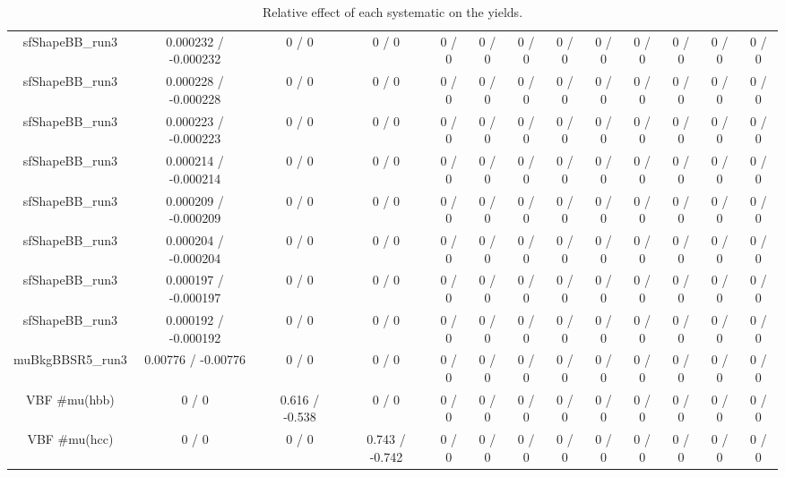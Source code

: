 \documentclass[10pt]{article}
\begin{document}
\begin{table}[htbp]
\begin{center}
\begin{tabular}{|c|c|c|c|c|c|c|c|c|c|c|c|c|}
  sfShapeBB_run3 & 0.000232 / -0.000232 & 0 / 0 & 0 / 0 & 0 / 0 & 0 / 0 & 0 / 0 & 0 / 0 & 0 / 0 & 0 / 0 & 0 / 0 & 0 / 0 & 0 / 0 \\ 
  sfShapeBB_run3 & 0.000228 / -0.000228 & 0 / 0 & 0 / 0 & 0 / 0 & 0 / 0 & 0 / 0 & 0 / 0 & 0 / 0 & 0 / 0 & 0 / 0 & 0 / 0 & 0 / 0 \\ 
  sfShapeBB_run3 & 0.000223 / -0.000223 & 0 / 0 & 0 / 0 & 0 / 0 & 0 / 0 & 0 / 0 & 0 / 0 & 0 / 0 & 0 / 0 & 0 / 0 & 0 / 0 & 0 / 0 \\ 
  sfShapeBB_run3 & 0.000214 / -0.000214 & 0 / 0 & 0 / 0 & 0 / 0 & 0 / 0 & 0 / 0 & 0 / 0 & 0 / 0 & 0 / 0 & 0 / 0 & 0 / 0 & 0 / 0 \\ 
  sfShapeBB_run3 & 0.000209 / -0.000209 & 0 / 0 & 0 / 0 & 0 / 0 & 0 / 0 & 0 / 0 & 0 / 0 & 0 / 0 & 0 / 0 & 0 / 0 & 0 / 0 & 0 / 0 \\ 
  sfShapeBB_run3 & 0.000204 / -0.000204 & 0 / 0 & 0 / 0 & 0 / 0 & 0 / 0 & 0 / 0 & 0 / 0 & 0 / 0 & 0 / 0 & 0 / 0 & 0 / 0 & 0 / 0 \\ 
  sfShapeBB_run3 & 0.000197 / -0.000197 & 0 / 0 & 0 / 0 & 0 / 0 & 0 / 0 & 0 / 0 & 0 / 0 & 0 / 0 & 0 / 0 & 0 / 0 & 0 / 0 & 0 / 0 \\ 
  sfShapeBB_run3 & 0.000192 / -0.000192 & 0 / 0 & 0 / 0 & 0 / 0 & 0 / 0 & 0 / 0 & 0 / 0 & 0 / 0 & 0 / 0 & 0 / 0 & 0 / 0 & 0 / 0 \\ 
  muBkgBBSR5_run3 & 0.00776 / -0.00776 & 0 / 0 & 0 / 0 & 0 / 0 & 0 / 0 & 0 / 0 & 0 / 0 & 0 / 0 & 0 / 0 & 0 / 0 & 0 / 0 & 0 / 0 \\ 
  VBF #mu(hbb) & 0 / 0 & 0.616 / -0.538 & 0 / 0 & 0 / 0 & 0 / 0 & 0 / 0 & 0 / 0 & 0 / 0 & 0 / 0 & 0 / 0 & 0 / 0 & 0 / 0 \\ 
  VBF #mu(hcc) & 0 / 0 & 0 / 0 & 0.743 / -0.742 & 0 / 0 & 0 / 0 & 0 / 0 & 0 / 0 & 0 / 0 & 0 / 0 & 0 / 0 & 0 / 0 & 0 / 0 \\ 
\hline 
\end{tabular} 
\caption{Relative effect of each systematic on the yields.} 
\end{center} 
\end{table} 
\end{document}
